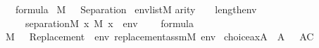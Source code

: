 \begin{isabelle}
{\isasymphi}\ {\isasymin}\ formula\ {\isasymLongrightarrow}\isanewline
{\isacharparenleft}{\kern0pt}M{\isacharcomma}{\kern0pt}\ {\isacharbrackleft}{\kern0pt}{\isacharbrackright}{\kern0pt}\ {\isasymTurnstile}\ {\isasymcdot}Separation{\isacharparenleft}{\kern0pt}{\isasymphi}{\isacharparenright}{\kern0pt}{\isasymcdot}{\isacharparenright}{\kern0pt}\ {\isasymlongleftrightarrow}\isanewline
{\isacharparenleft}{\kern0pt}{\isasymforall}env{\isasymin}list{\isacharparenleft}{\kern0pt}M{\isacharparenright}{\kern0pt}{\isachardot}{\kern0pt}\isanewline
\isaindent{{\isacharparenleft}{\kern0pt}\ \ \ }arity{\isacharparenleft}{\kern0pt}{\isasymphi}{\isacharparenright}{\kern0pt}\ {\isasymle}\ {}\ {\isacharplus}{\kern0pt}\isactrlsub {\isasymomega}\ length{\isacharparenleft}{\kern0pt}env{\isacharparenright}{\kern0pt}\ {\isasymlongrightarrow}\isanewline
\ \ \ \ separation{\isacharparenleft}{\kern0pt}{\isacharhash}{\kern0pt}{\isacharhash}{\kern0pt}M{\isacharcomma}{\kern0pt}\ {\isasymlambda}x{\isachardot}{\kern0pt}\ M{\isacharcomma}{\kern0pt}\ {\isacharbrackleft}{\kern0pt}x{\isacharbrackright}{\kern0pt}\ {\isacharat}{\kern0pt}\ env\ {\isasymTurnstile}\ {\isasymphi}{\isacharparenright}{\kern0pt}{\isacharparenright}{\kern0pt}\isasep\isanewline\isanewline%
{\isasymphi}\ {\isasymin}\ formula\ {\isasymLongrightarrow}\isanewline
{\isacharparenleft}{\kern0pt}M{\isacharcomma}{\kern0pt}\ {\isacharbrackleft}{\kern0pt}{\isacharbrackright}{\kern0pt}\ {\isasymTurnstile}\ {\isasymcdot}Replacement{\isacharparenleft}{\kern0pt}{\isasymphi}{\isacharparenright}{\kern0pt}{\isasymcdot}{\isacharparenright}{\kern0pt}\ {\isasymlongleftrightarrow}\ {\isacharparenleft}{\kern0pt}{\isasymforall}env{\isachardot}{\kern0pt}\ replacement{\isacharunderscore}{\kern0pt}assm{\isacharparenleft}{\kern0pt}M{\isacharcomma}{\kern0pt}\ env{\isacharcomma}{\kern0pt}\ {\isasymphi}{\isacharparenright}{\kern0pt}{\isacharparenright}\isanewline\isanewline%
choice{\isacharunderscore}{\kern0pt}ax{\isacharparenleft}{\kern0pt}{\isacharhash}{\kern0pt}{\isacharhash}{\kern0pt}A{\isacharparenright}{\kern0pt}\ {\isasymlongleftrightarrow}\ A{\isacharcomma}{\kern0pt}\ {\isacharbrackleft}{\kern0pt}{\isacharbrackright}{\kern0pt}\ {\isasymTurnstile}\ {\isasymcdot}AC{\isasymcdot}%
\end{isabelle}%
